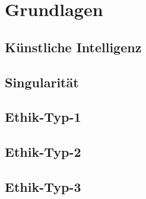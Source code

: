 \section{Grundlagen}

\subsection{Künstliche Intelligenz}

\subsection{Singularität}

\subsection{Ethik-Typ-1}

\subsection{Ethik-Typ-2}

\subsection{Ethik-Typ-3}
